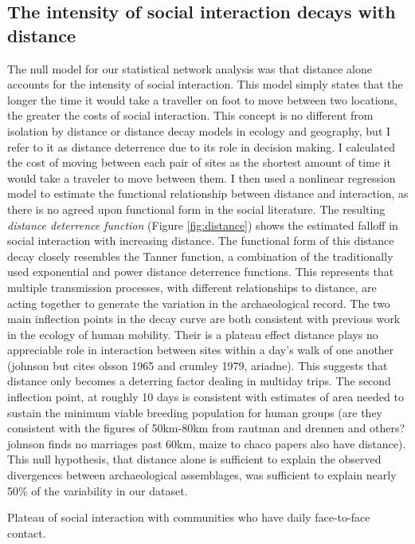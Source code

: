 \documentclass[fleqn,10pt]{wlscirep}
\begin{document}
\subsection*{The intensity of social interaction decays with distance}
The null model for our statistical network analysis was that distance alone accounts for the intensity of social interaction. This model simply states that the longer the time it would take a traveller on foot to move between two locations, the greater the costs of social interaction. This concept is no different from isolation by distance or distance decay models in ecology and geography, but I refer to it as distance deterrence due to its role in decision making. I calculated the cost of moving between each pair of sites as the shortest amount of time it would take a traveler to move between them. I then used a nonlinear regression model to estimate the functional relationship between distance and interaction, as there is no agreed upon functional form in the social literature. 
The resulting \textit{distance deterrence function} (Figure \ref{fig:distance}) shows the estimated falloff in social interaction with increasing distance. The functional form of this distance decay closely resembles the Tanner function, a combination of the traditionally used exponential and power distance deterrence functions. This represents that multiple transmission processes, with different relationships to distance, are acting together to generate the variation in the archaeological record. The two main inflection points in the decay curve are both consistent with previous work in the ecology of human mobility. Their is a plateau effect distance plays no appreciable role in interaction between sites within a day's walk of one another (johnson but cites olsson 1965 and crumley 1979, ariadne). This suggests that distance only becomes a deterring factor dealing in multiday trips. The second inflection point, at roughly 10 days is consistent with estimates of area needed to sustain the minimum viable breeding population for human groups (are they consistent with the figures of 50km-80km from rautman and drennen and others? johnson finds no marriages past 60km, maize to chaco papers also have distance). This null hypothesis, that distance alone is sufficient to explain the observed divergences between archaeological assemblages, was sufficient to explain nearly 50\% of the variability in our dataset.  

Plateau of social interaction with communities who have daily face-to-face contact.
\end{document}
